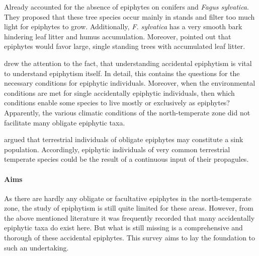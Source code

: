 \documentclass[12pt, a4paper, oneside, draft]{article}
\begin{document}

Already \textcite[p. 34]{Staeger1908} accounted for the absence of epiphytes on conifers and \textit{Fagus sylvatica}. They proposed that these tree species occur mainly in  stands and filter too much light for epiphytes to grow. Additionally, \textit{F. sylvatica} has a very smooth bark hindering leaf litter and humus accumulation. Moreover, \textcite{Staeger1908} pointed out that epiphytes would favor large, single standing trees with accumulated leaf litter.


\textcite{Zotz2003} drew the attention to the fact, that understanding accidental epiphytism is vital to understand epiphytism itself. In detail, this contains the questions for the necessary conditions for epiphytic individuals. Moreover, when the environmental conditions are met for single accidentally epiphytic individuals, then which conditions enable some species to live mostly or exclusively as epiphytes? Apparently, the various climatic conditions of the north-temperate zone did not facilitate many obligate epiphytic taxa.

\textcite{Burns2010} argued that terrestrial individuals of obligate epiphytes may constitute a sink population. Accordingly, epiphytic individuals of very common terrestrial temperate species could be the result of a continuous input of their propagules.


\paragraph{Aims}
As there are hardly any obligate or facultative epiphytes in the north-temperate zone, the study of epiphytism is still quite limited for these areas. However, from the above mentioned literature it was frequently recorded that many accidentally epiphytic taxa do exist here. But what is still missing is a comprehensive and thorough  of these accidental epiphytes. This survey aims to lay the foundation to such an undertaking.
\end{document}
